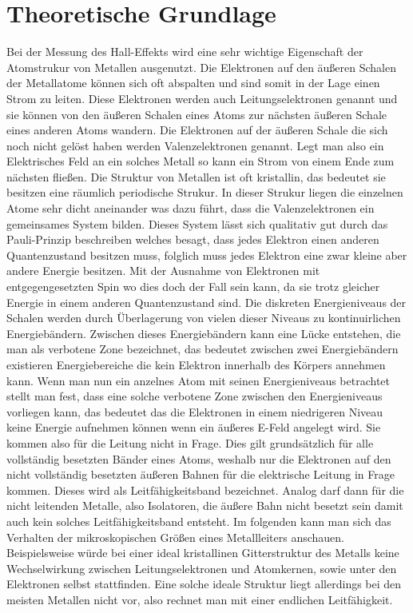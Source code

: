 \section{Theoretische Grundlage}

Bei der Messung des Hall-Effekts wird eine sehr wichtige Eigenschaft der Atomstrukur von Metallen ausgenutzt.
Die Elektronen auf den äußeren Schalen der Metallatome können sich oft abspalten und sind somit in der Lage
einen Strom zu leiten. Diese Elektronen werden auch Leitungselektronen genannt und sie können von den äußeren Schalen
eines Atoms zur nächsten äußeren Schale eines anderen Atoms wandern. Die Elektronen auf der äußeren Schale die sich noch nicht gelöst haben werden Valenzelektronen
genannt. Legt man also ein Elektrisches Feld an ein solches Metall so kann ein Strom von einem Ende zum nächsten fließen.
Die Struktur von Metallen ist oft kristallin, das bedeutet sie besitzen eine räumlich periodische Strukur. In dieser Strukur liegen die einzelnen Atome sehr dicht aneinander 
was dazu führt, dass die Valenzelektronen ein gemeinsames System bilden. Dieses System lässt sich qualitativ gut durch das Pauli-Prinzip beschreiben welches besagt, dass
jedes Elektron einen anderen Quantenzustand besitzen muss, folglich muss jedes Elektron eine zwar kleine aber andere Energie besitzen. Mit der Ausnahme von Elektronen
mit entgegengesetzten Spin wo dies doch der Fall sein kann, da sie trotz gleicher Energie in einem anderen Quantenzustand sind. Die diskreten Energieniveaus der Schalen
werden durch Überlagerung von vielen dieser Niveaus zu kontinuirlichen Energiebändern. Zwischen dieses Energiebändern kann eine Lücke entstehen, die man 
als verbotene Zone bezeichnet, das bedeutet zwischen zwei Energiebändern existieren Energiebereiche die kein Elektron innerhalb des Körpers annehmen kann.
Wenn man nun ein anzelnes Atom mit seinen Energieniveaus betrachtet stellt man fest, dass eine solche verbotene Zone zwischen den Energieniveaus vorliegen kann, das bedeutet
das die Elektronen in einem niedrigeren Niveau keine Energie aufnehmen können wenn ein äußeres E-Feld angelegt wird. Sie kommen also für die Leitung nicht in Frage. 
Dies gilt grundsätzlich für alle vollständig besetzten Bänder eines Atoms, weshalb nur die Elektronen auf den nicht vollständig
besetzten äußeren Bahnen für die elektrische Leitung in Frage kommen. Dieses wird als Leitfähigkeitsband bezeichnet.
Analog darf dann für die nicht leitenden Metalle, also Isolatoren, die äußere Bahn nicht besetzt sein damit auch kein solches Leitfähigkeitsband entsteht.
Im folgenden kann man sich das Verhalten der mikroskopischen Größen eines Metallleiters anschauen.
Beispielsweise würde bei einer ideal kristallinen Gitterstruktur des Metalls keine Wechselwirkung zwischen Leitungselektronen und Atomkernen, sowie unter den Elektronen
selbst stattfinden. Eine solche ideale Struktur liegt allerdings bei den meisten Metallen nicht vor, also rechnet man mit einer endlichen Leitfähigkeit.



